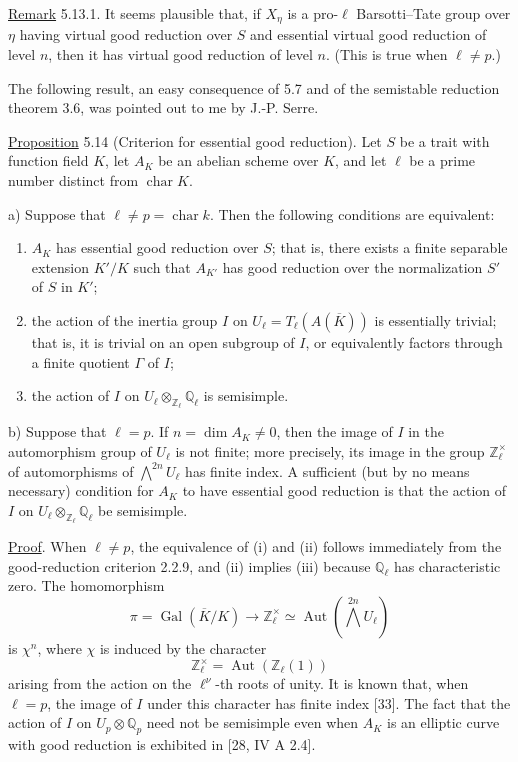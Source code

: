 \medskip
\noindent
\underline{Remark} 5.13.1. It seems plausible that, if $X_\eta$ is a
pro-$\ell$ Barsotti--Tate group over $\eta$ having virtual good
reduction over $S$ and essential virtual good reduction of level $n$,
then it has virtual good reduction of level $n$. (This is true when
$\ell\neq p$.)

The following result, an easy consequence of 5.7 and of the
semistable reduction theorem 3.6, was pointed out to me by
J.-P. Serre.

\medskip
\noindent
\underline{Proposition} 5.14 (Criterion for essential good reduction).
Let $S$ be a trait with function field $K$, let $A_K$ be an abelian
scheme over $K$, and let $\ell$ be a prime number distinct from
$\operatorname{char}K$.

\smallskip
\noindent
a) Suppose that $\ell\neq p=\operatorname{char}k$. Then the following
conditions are equivalent:
\begin{enumerate}
\item[(i)] $A_K$ has essential good reduction over $S$; that is, there
  exists a finite separable extension $K'/K$ such that $A_{K'}$ has
  good reduction over the normalization $S'$ of $S$ in $K'$;
\item[(ii)] the action of the inertia group $I$ on
  $U_\ell=T_\ell(A(\overline K))$ is essentially trivial; that is, it
  is trivial on an open subgroup of $I$, or equivalently factors
  through a finite quotient $\Gamma$ of $I$;
\item[(iii)] the action of $I$ on
  $U_\ell\otimes_{\mathbb Z_\ell}\mathbb Q_\ell$ is semisimple.
\end{enumerate}

\noindent
b) Suppose that $\ell=p$. If $n=\dim A_K\neq0$, then the image of $I$
in the automorphism group of $U_\ell$ is not finite; more precisely,
its image in the group $\mathbb Z_\ell^\times$ of automorphisms of
$\bigwedge^{2n}U_\ell$ has finite index. A sufficient (but by no means
necessary) condition for $A_K$ to have essential good reduction is
that the action of $I$ on
$U_\ell\otimes_{\mathbb Z_\ell}\mathbb Q_\ell$ be semisimple.

\noindent
\underline{Proof}. When $\ell\neq p$, the equivalence of (i) and (ii)
follows immediately from the good-reduction criterion 2.2.9, and (ii)
implies (iii) because $\mathbb Q_\ell$ has characteristic zero. The
homomorphism
\[
 \pi=\operatorname{Gal}(\overline K/K)
 \longrightarrow \mathbb Z_\ell^\times
 \simeq\operatorname{Aut}\!\left(\bigwedge^{2n}U_\ell\right)
\]
is $\chi^n$, where $\chi$ is induced by the character
\[
 \mathbb Z_\ell^\times=\operatorname{Aut}(\mathbb Z_\ell(1))
\]
arising from the action on the $\ell^\nu$-th roots of unity. It is
known that, when $\ell=p$, the image of $I$ under this character has
finite index [33]. The fact that the action of $I$ on
$U_p\otimes\mathbb Q_p$ need not be semisimple even when $A_K$ is an
elliptic curve with good reduction is exhibited in [28, IV A 2.4].

